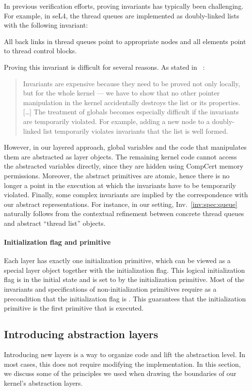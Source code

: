 {In previous verification efforts,
proving invariants has typically been challenging.
For example, in seL4, the thread queues are implemented as doubly-linked lists with 
the following invariant:
\begin{invariant}
\label{inv:spec:queue}
 All back links in thread queues point to appropriate nodes and all elements point
 to thread control blocks.
\end{invariant}
Proving this invariant is difficult
for several reasons.
As stated in ~\cite{klein2009sel4}:
\begin{quote}
  Invariants are expensive because
  they need to be proved not only locally,
  but for the whole kernel ---
  we have to show that no other pointer manipulation in the kernel
  accidentally destroys the list or its properties.
  [\ldots]
  The treatment of globals becomes especially difficult
  if the invariants are temporarily violated.
  For example,
  adding a new node to a doubly-linked list
  temporarily violates invariants that the list is well formed.
\end{quote}
However, in our layered approach,
global variables and the code that manipulates them
are abstracted as layer objects.
The remaining kernel code cannot access
the abstracted variables directly,
since they are hidden using CompCert memory permissions.
Moreover,
the abstract primitives are atomic,
hence there is no longer a point in the execution
at which the invariants have to be temporarily violated.
Finally, some complex invariants are implied by
the correspondence with our abstract representations.
For instance, in our setting, Inv.~\ref{inv:spec:queue} 
naturally follows from the contextual refinement between
concrete thread queues and
abstract ``thread list'' objects.

\paragraph{Initialization flag and primitive}
Each layer has exactly one
initialization primitive, which can be viewed as a special
layer object together with the initialization flag. This logical initialization flag 
is  in the initial state and is set to  by the initialization 
primitive. Most of the invariants and specifications of
non-initialization primitives require as a precondition that
the initialization flag is .
This guarantees that the initialization primitive is the first primitive that is executed. 

\subsection{Introducing abstraction layers}
Introducing new layers is a way to organize code and lift the abstraction level.
In most cases, this does not require modifying the implementation.
In this section,
we discuss some of the principles we used
when drawing the boundaries
of our kernel's abstraction layers.}


